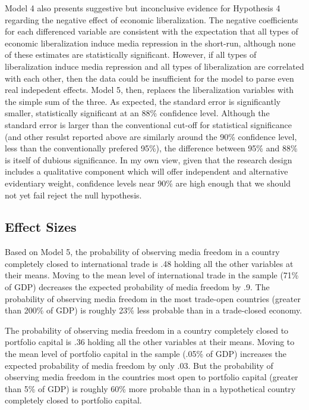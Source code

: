 \documentclass[12pt]{report}
\begin{document}
Model 4 also presents suggestive but inconclusive evidence for Hypothesis 4 regarding the negative
effect of economic liberalization. The negative coefficients for each differenced variable are
consistent with the expectation that all types of economic liberalization induce media repression in
the short-run, although none of these estimates are statistically significant. However, if all types
of liberalization induce media repression and all types of liberalization are correlated with each
other, then the data could be insufficient for the model to parse even real indepedent effects.
Model 5, then, replaces the liberalization variables with the simple sum of the three. As expected,
the standard error is significantly smaller, statistically significant at an 88\% confidence level.
Although the standard error is larger than the conventional cut-off for statistical significance
(and other resulst reported above are similarly around the 90\% confidence level, less than the
conventionally prefered 95\%), the difference between 95\% and 88\% is itself of dubious
significance. In my own view, given that the research design includes a qualitative component which
will offer independent and alternative evidentiary weight, confidence levels near 90\% are high
enough that we should not yet fail reject the null hypothesis.

\subsection{Effect Sizes}

Based on Model 5, the probability of observing media freedom in a country completely closed to
international trade is .48 holding all the other variables at their means. Moving to the mean level
of international trade in the sample (71\% of GDP) decreases the expected probability of media
freedom by .9. The probability of observing media freedom in the most trade-open countries (greater
than 200\% of GDP) is roughly 23\% less probable than in a trade-closed economy.

The probability of observing media freedom in a country completely closed to portfolio capital is
.36 holding all the other variables at their means. Moving to the mean level of portfolio capital in
the sample (.05\% of GDP) increases the expected probability of media freedom by only .03. But the
probability of observing media freedom in the countries most open to portfolio capital (greater than
5\% of GDP) is roughly 60\% more probable than in a hypothetical country completely closed to
portfolio capital.
\end{document}
